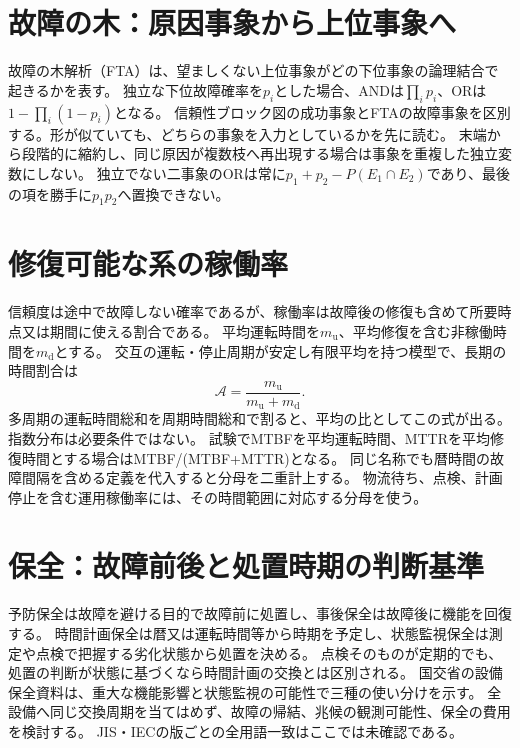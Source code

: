 \section{故障の木：原因事象から上位事象へ}
\label{theory:dependability:fta}
故障の木解析（FTA）は、望ましくない上位事象がどの下位事象の論理結合で起きるかを表す。
独立な下位故障確率を\(p_i\)とした場合、ANDは\(\prod_i p_i\)、ORは\(1-\prod_i(1-p_i)\)となる。
信頼性ブロック図の成功事象とFTAの故障事象を区別する。形が似ていても、どちらの事象を入力としているかを先に読む。
末端から段階的に縮約し、同じ原因が複数枝へ再出現する場合は事象を重複した独立変数にしない。
独立でない二事象のORは常に\(p_1+p_2-P(E_1\cap E_2)\)であり、最後の項を勝手に\(p_1p_2\)へ置換できない。

\section{修復可能な系の稼働率}
\label{theory:dependability:availability}
信頼度は途中で故障しない確率であるが、稼働率は故障後の修復も含めて所要時点又は期間に使える割合である。
平均運転時間を\(m_{\mathrm u}\)、平均修復を含む非稼働時間を\(m_{\mathrm d}\)とする。
交互の運転・停止周期が安定し有限平均を持つ模型で、長期の時間割合は
\[
 \mathcal A=\frac{m_{\mathrm u}}{m_{\mathrm u}+m_{\mathrm d}}.
\]
多周期の運転時間総和を周期時間総和で割ると、平均の比としてこの式が出る。指数分布は必要条件ではない。
試験でMTBFを平均運転時間、MTTRを平均修復時間とする場合はMTBF/(MTBF+MTTR)となる。
同じ名称でも暦時間の故障間隔を含める定義を代入すると分母を二重計上する。
物流待ち、点検、計画停止を含む運用稼働率には、その時間範囲に対応する分母を使う。

\section{保全：故障前後と処置時期の判断基準}
\label{theory:dependability:maintenance}
予防保全は故障を避ける目的で故障前に処置し、事後保全は故障後に機能を回復する。
時間計画保全は暦又は運転時間等から時期を予定し、状態監視保全は測定や点検で把握する劣化状態から処置を決める。
点検そのものが定期的でも、処置の判断が状態に基づくなら時間計画の交換とは区別される。
国交省の設備保全資料は、重大な機能影響と状態監視の可能性で三種の使い分けを示す。\cite{maintenance_mlit_2013}
全設備へ同じ交換周期を当てはめず、故障の帰結、兆候の観測可能性、保全の費用を検討する。
JIS・IECの版ごとの全用語一致はここでは未確認である。

